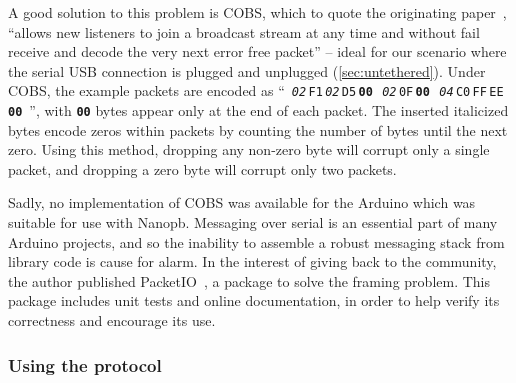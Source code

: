 \documentclass[main.tex]{subfiles}
\begin{document}
		A good solution to this problem is COBS, which to quote the originating paper~\cite{cobs}, \enquote{allows new listeners to join a broadcast stream at any time and without fail receive and decode the very next error free packet} -- ideal for our scenario where the serial USB connection is plugged and unplugged (\cref{sec:untethered}). Under COBS, the example packets are encoded as
		\mbox{\enquote{%
			\textit{\texttt{02}}\,\texttt{F1}\,\textit{\texttt{02}}\,\texttt{D5}\,\textbf{\texttt{00}}\,%
			\textit{\texttt{02}}\,\texttt{0F}\,\textbf{\texttt{00}}\,%
			\textit{\texttt{04}}\,\texttt{C0}\,\texttt{FF}\,\texttt{EE}\,\textbf{\texttt{00}}%
		}}, with \textbf{\texttt{00}} bytes appear only at the end of each packet.
		The inserted italicized bytes encode zeros within packets by counting the number of bytes until the next zero.
		Using this method, dropping any non-zero byte will corrupt only a single packet, and dropping a zero byte will corrupt only two packets.

		Sadly, no implementation of COBS was available for the Arduino which was suitable for use with Nanopb\footnotemark.
		Messaging over serial is an essential part of many Arduino projects, and so the inability to assemble a robust messaging stack from library code is cause for alarm.
		In the interest of giving back to the community, the author published PacketIO~\cite{packetio}, a package to solve the framing problem.
		This package includes unit tests and online documentation, in order to help verify its correctness and encourage its use.


	\subsubsection{Using the protocol}
\end{document}

